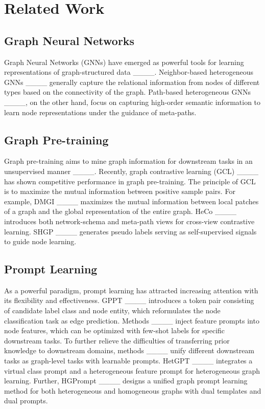 \section{Related Work}
\subsection{Graph Neural Networks}

Graph Neural Networks (GNNs) have emerged as powerful tools for learning representations of graph-structured data ____. Neighbor-based heterogeneous GNNs ____ generally capture the relational information from nodes of different types based on the connectivity of the graph. Path-based heterogeneous GNNs ____, on the other hand, focus on capturing high-order semantic information to learn node representations under the guidance of meta-paths.

\vspace{-2mm}

\subsection{Graph Pre-training}

Graph pre-training aims to mine graph information for downstream tasks in an unsupervised manner ____. Recently, graph contrastive learning (GCL) ____ has shown competitive performance in graph pre-training. The principle of GCL is to maximize the mutual information between positive sample pairs. For example, DMGI ____ maximizes the mutual information between local patches of a graph and the global representation of the entire graph. HeCo ____ introduces both network-schema and meta-path views for cross-view contrastive learning. SHGP ____ generates pseudo labels serving as self-supervised signals to guide node learning.

\vspace{-2mm}

\subsection{Prompt Learning}

As a powerful paradigm, prompt learning has attracted increasing attention with its flexibility and effectiveness. GPPT ____ introduces a token pair consisting of candidate label class and node entity, which reformulates the node classification task as edge prediction. Methods ____ inject feature prompts into node features, which can be optimized with few-shot labels for specific downstream tasks. To further relieve the difficulties of transferring prior knowledge to downstream domains, methods ____ unify different downstream tasks as graph-level tasks with learnable prompts. HetGPT ____ integrates a virtual class prompt and a heterogeneous feature prompt for heterogeneous graph learning. Further, HGPrompt ____ designs a unified graph prompt learning method for both heterogeneous and homogeneous graphs with dual templates and dual prompts.